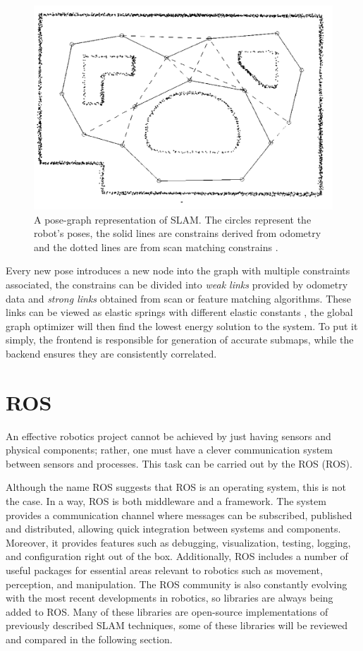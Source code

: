 \begin{figure}[H]
    \centering
    \includegraphics[width=0.7\linewidth]{images/background/graph_SLAM.png}
    \caption{A pose-graph representation of \acs*{SLAM}. The circles represent the robot's poses, the solid lines are constrains derived from odometry and the dotted lines are from scan matching constrains \cite{lu_globally_1997}.}
    \label{fig: graph SLAM}
\end{figure}

Every new pose introduces a new node into the graph with multiple constraints associated, the constrains can be divided into \textit{weak links} provided by odometry data and \textit{strong links} obtained from scan or feature matching algorithms. These links can be viewed as elastic springs with different elastic constants \cite{lu_globally_1997}, the global graph optimizer will then find the lowest energy solution to the system. To put it simply, the frontend is responsible for generation of accurate submaps, while the backend ensures they are consistently correlated.

\section{\acs{ROS}}

An effective robotics project cannot be achieved by just having sensors and physical components; rather, one must have a clever communication system between sensors and processes. This task can be carried out by the \acl*{ROS} (\acs*{ROS}). 

Although the name \acl*{ROS} suggests that \acs*{ROS} is an operating system, this is not the case.  In a way, \acs*{ROS} is both middleware and a framework. The system provides a communication channel where messages can be subscribed, published and distributed, allowing quick integration between systems and components. Moreover, it provides features such as debugging, visualization, testing, logging, and configuration right out of the box. Additionally, ROS includes a number of useful packages for essential areas relevant to robotics such as movement, perception, and manipulation. The ROS community is also constantly evolving with the most recent developments in robotics, so libraries are always being added to ROS. Many of these libraries are open-source implementations of previously described \acs*{SLAM} techniques, some of these libraries will be reviewed and compared in the following section.


